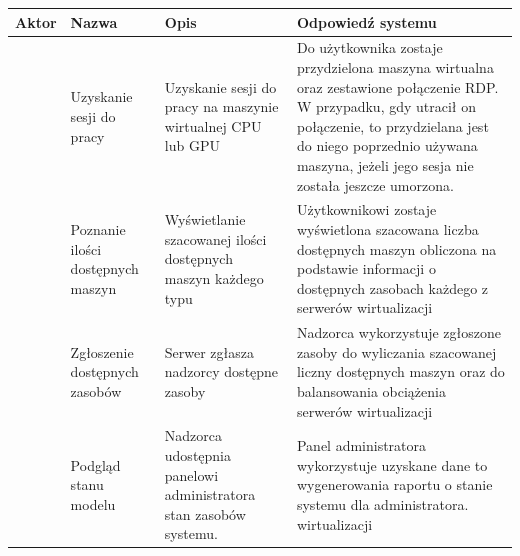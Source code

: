 \documentclass[12pt]{article}
\begin{document}
\begin{center}
	\begin{table}[h!]
		\begin{tabular}{|p{}|p{}|p{}|p{}|}
			\hline Aktor                                                                    & Nazwa                             & Opis                                                          & Odpowiedź systemu                                                                                                                                                                                                                       \\ \hline
			\multirow{14}{=}{\rotatebox{90}{Użytkownik}}                                    & Uzyskanie sesji do pracy          & Uzyskanie sesji do pracy na maszynie wirtualnej CPU lub GPU   & Do użytkownika zostaje przydzielona maszyna wirtualna oraz zestawione połączenie RDP. W przypadku, gdy utracił on połączenie, to przydzielana jest do niego poprzednio używana maszyna, jeżeli jego sesja nie została jeszcze umorzona. \\ \cline{2-4}
			                                                                                & Poznanie ilości dostępnych maszyn & Wyświetlanie szacowanej ilości dostępnych maszyn każdego typu & Użytkownikowi zostaje wyświetlona szacowana liczba dostępnych maszyn obliczona na podstawie informacji o dostępnych zasobach każdego z serwerów wirtualizacji                                                                           \\ \hline
			\multirow[b]{5}{=}{\rotatebox{90}{\parbox{1cm}{Serwer \newline wirtualizacji}}} & Zgłoszenie dostępnych zasobów     & Serwer zgłasza nadzorcy dostępne zasoby                       & Nadzorca wykorzystuje zgłoszone zasoby do wyliczania szacowanej liczny dostępnych maszyn oraz do balansowania obciążenia serwerów wirtualizacji                                                                                         \\
			\hline
			\multirow[b]{6}{=}{\rotatebox{90}{\parbox{1cm}{Panel \newline administratora}}} & Podgląd stanu modelu    & Nadzorca udostępnia panelowi administratora stan zasobów systemu.                       & Panel administratora wykorzystuje uzyskane dane to wygenerowania raportu o stanie systemu dla administratora. wirtualizacji     \newline                                                                                    \\
			\hline
		\end{tabular}
	\end{table}
\end{center}
\end{document}
